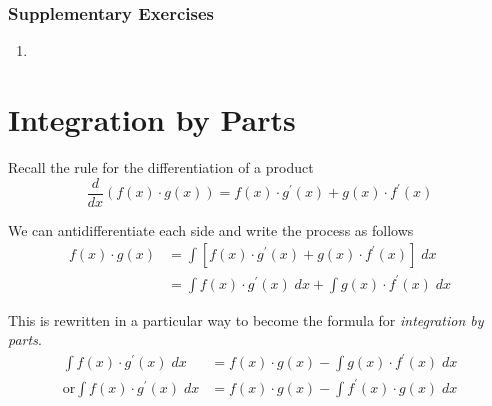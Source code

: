 \subsubsection{Supplementary Exercises}
\begin{enumerate}
\item   
\columnsep =30pt
  \end{enumerate}


\section{Integration by Parts}
Recall the rule for the differentiation of a product
\begin{equation*}\frac{d}{d x} \left (f (x) \cdot g (x)\right ) =f (x) \cdot g^{ \prime } (x) +g (x) \cdot f^{ \prime } (x)
\end{equation*}

We can antidifferentiate each side and write the process as follows
\begin{align*}f (x) \cdot g (x) &  = \int \left [f (x) \cdot g^{ \prime } (x) +g (x) \cdot f^{ \prime } (x)\right ]\; d x \\
 &  = \int f (x) \cdot g^{ \prime } (x)\; d x +\int g (x) \cdot f^{ \prime } (x)\; d x\end{align*}

This is rewritten in a particular way to become the formula for \emph{integration by parts}.
\begin{align}\int f (x) \cdot g^{ \prime } (x)\; d x &  = f (x) \cdot g (x) -\int g (x) \cdot f^{ \prime } (x)\; d x \tag{1} \\
\text{or}\int f (x) \cdot g^{ \prime } (x)\; d x &  = f (x) \cdot g (x) -\int f^{ \prime } (x) \cdot g (x)\; d x \tag{2}\end{align}

